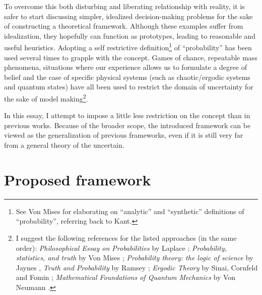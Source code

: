 \documentclass{article}
\begin{document}
To overcome this both disturbing and liberating relationship with reality, it is safer to start discussing simpler, idealized decision-making problems for the sake of constructing a theoretical framework.
Although these examples suffer from idealization, they hopefully can function as prototypes, leading to reasonable and useful heuristics.
Adopting a self restrictive definition\footnote{See Von Mises \cite{book:VonMises} for elaborating on ``analytic'' and ``synthetic'' definitions of ``probability'', referring back to Kant.} of ``probability'' has been used several times to grapple with the concept.
Games of chance,
repeatable mass phenomena,
situations where our experience allows us to formulate a degree of belief
and the case of specific physical systems (such as chaotic/ergodic systems
and quantum states)
have all been used to restrict the domain of uncertainty for the sake of model making\footnote
{
I suggest the following references for the listed approaches (in the same order):
\emph{Philosophical Essay on Probabilities} by Laplace \cite{book:Laplace};
\emph{Probability, statistics, and truth} by Von Mises \cite{book:VonMises};
\emph{Probability theory: the logic of science} by Jaynes \cite{book:Jaynes}, \emph{Truth and Probability} by Ramsey \cite{essay:Ramsey};
\emph{Ergodic Theory} by Sinai, Cornfeld and Fomin \cite{book:ErgodicTheory};
\emph{Mathematical Foundations of Quantum Mechanics} by Von Neumann \cite{book:NeumannQuantum}.
}.

In this essay, I attempt to impose a little less restriction on the concept than in previous works.
Because of the broader scope, the introduced framework can be viewed as the generalization of previous frameworks, even if it is still very far from a general theory of the uncertain.

\section*{Proposed framework}
\end{document}
